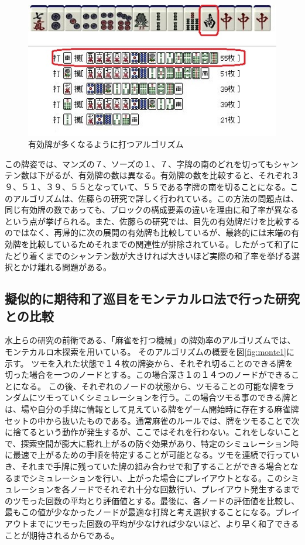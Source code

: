 \begin{figure}[h]
 \centering
 \includegraphics[keepaspectratio, scale=1,bb=0 0 320 239]
      {img/yuko.jpg}
 \caption{有効牌が多くなるように打つアルゴリズム}
 \label{yuko}
\end{figure}

この牌姿では、マンズの７、ソーズの１、７、字牌の南のどれを切ってもシャンテン数は下がるが、有効牌の数は異なる。有効牌の数を比較すると、それぞれ３９、５１、３９、５５となっていて、５５である字牌の南を切ることになる。このアルゴリズムは、佐藤ら\cite{zentsu}の研究で詳しく行われている。この方法の問題点は、同じ有効牌の数であっても、ブロックの構成要素の違いを理由に和了率が異なるという点が挙げられる。また、佐藤らの研究では、目先の有効牌だけを比較するのではなく、再帰的に次の展開の有効牌も比較しているが、最終的には末端の有効牌を比較しているためそれまでの関連性が排除されている。したがって和了にたどり着くまでのシャンテン数が大きければ大きいほど実際の和了率を挙げる選択とかけ離れる問題がある。


\subsection{擬似的に期待和了巡目をモンテカルロ法で行った研究との比較}

水上ら\cite{bakuuti}の研究の前衛である、「麻雀を打つ機械」\cite{nmizu}の牌効率のアルゴリズムでは、モンテカルロ木探索を用いている。
そのアルゴリズムの概要を図\ref{fig:monte1}に示す。
ツモを入れた状態で１４枚の牌姿から、それぞれ切ることのできる牌を切った場合を一つのノードとする。この場合深さ１の１４つのノードができることになる。
この後、それぞれのノードの状態から、ツモることの可能な牌をランダムにツモっていくシミュレーションを行う。この場合ツモる事のできる牌とは、場や自分の手牌に情報として見えている牌をゲーム開始時に存在する麻雀牌セットの中から抜いたものである。通常麻雀のルールでは、牌をツモることで次に捨てるという動作が発生するが、ここではそれを行わない。これをしないことで、探索空間が膨大に膨れ上がるの防ぐ効果があり、特定のシミュレーション時に最速で上がるための手順を特定することが可能となる。ツモを連続で行っていき、それまで手牌に残っていた牌の組み合わせで和了することができる場合となるまでシミュレーションを行い、上がった場合にプレイアウトとなる。このシミュレーションを各ノードでそれぞれ十分な回数行い、プレイアウト発生するまでのツモった回数の平均とり評価値とする。最後に、各ノードの評価値を比較し、最もこの値が少なかったノードが最適な打牌と考え選択することになる。プレイアウトまでにツモった回数の平均が少なければ少ないほど、より早く和了できることが期待されるからである。

